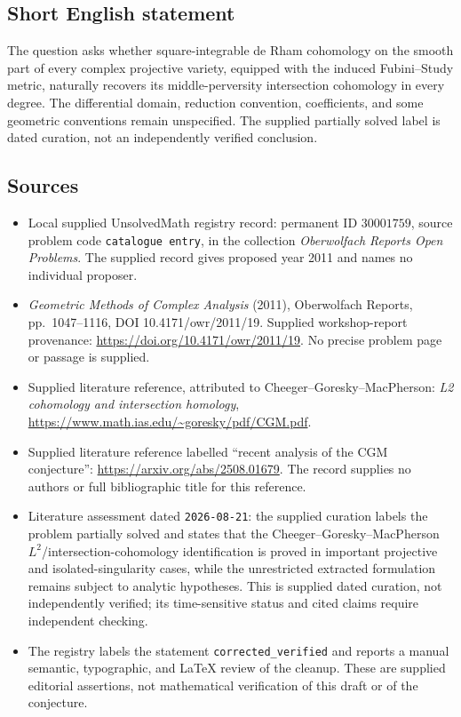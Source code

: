 \documentclass[11pt]{article}
\begin{document}
\subsection{Short English statement}
The question asks whether square-integrable de Rham cohomology on the smooth part of every complex projective variety, equipped with the induced Fubini--Study metric, naturally recovers its middle-perversity intersection cohomology in every degree. The differential domain, reduction convention, coefficients, and some geometric conventions remain unspecified. The supplied partially solved label is dated curation, not an independently verified conclusion.
\subsection{Sources}
\begin{itemize}
\item Local supplied UnsolvedMath registry record: permanent ID \(30001759\), source problem code \texttt{catalogue entry}, in the collection \emph{Oberwolfach Reports Open Problems}. The supplied record gives proposed year 2011 and names no individual proposer.
\item \emph{Geometric Methods of Complex Analysis} (2011), Oberwolfach Reports, pp.\ 1047--1116, DOI 10.4171/owr/2011/19. Supplied workshop-report provenance: \url{https://doi.org/10.4171/owr/2011/19}. No precise problem page or passage is supplied.
\item Supplied literature reference, attributed to Cheeger--Goresky--MacPherson: \emph{L2 cohomology and intersection homology}, \url{https://www.math.ias.edu/~goresky/pdf/CGM.pdf}.
\item Supplied literature reference labelled ``recent analysis of the CGM conjecture'': \url{https://arxiv.org/abs/2508.01679}. The record supplies no authors or full bibliographic title for this reference.
\item Literature assessment dated \texttt{2026-08-21}: the supplied curation labels the problem partially solved and states that the Cheeger--Goresky--MacPherson \(L^{2}\)/intersection-cohomology identification is proved in important projective and isolated-singularity cases, while the unrestricted extracted formulation remains subject to analytic hypotheses. This is supplied dated curation, not independently verified; its time-sensitive status and cited claims require independent checking.
\item The registry labels the statement \texttt{corrected\_verified} and reports a manual semantic, typographic, and LaTeX review of the cleanup. These are supplied editorial assertions, not mathematical verification of this draft or of the conjecture.
\end{itemize}
\end{document}
